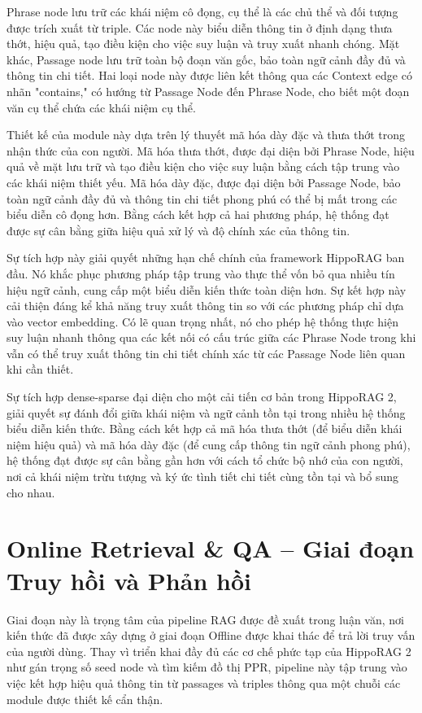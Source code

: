 \documentclass[../main.tex]{subfiles}
\begin{document}
Phrase node lưu trữ các khái niệm cô đọng, cụ thể là các chủ thể và đối tượng được trích xuất từ triple. Các node này biểu diễn thông tin ở định dạng thưa thớt, hiệu quả, tạo điều kiện cho việc suy luận và truy xuất nhanh chóng. Mặt khác, Passage node lưu trữ toàn bộ đoạn văn gốc, bảo toàn ngữ cảnh đầy đủ và thông tin chi tiết. Hai loại node này được liên kết thông qua các Context edge có nhãn "contains," có hướng từ Passage Node đến Phrase Node, cho biết một đoạn văn cụ thể chứa các khái niệm cụ thể.

Thiết kế của module này dựa trên lý thuyết mã hóa dày đặc và thưa thớt trong nhận thức của con người. Mã hóa thưa thớt, được đại diện bởi Phrase Node, hiệu quả về mặt lưu trữ và tạo điều kiện cho việc suy luận bằng cách tập trung vào các khái niệm thiết yếu. Mã hóa dày đặc, được đại diện bởi Passage Node, bảo toàn ngữ cảnh đầy đủ và thông tin chi tiết phong phú có thể bị mất trong các biểu diễn cô đọng hơn. Bằng cách kết hợp cả hai phương pháp, hệ thống đạt được sự cân bằng giữa hiệu quả xử lý và độ chính xác của thông tin.

Sự tích hợp này giải quyết những hạn chế chính của framework HippoRAG ban đầu. Nó khắc phục phương pháp tập trung vào thực thể vốn bỏ qua nhiều tín hiệu ngữ cảnh, cung cấp một biểu diễn kiến thức toàn diện hơn. Sự kết hợp này cải thiện đáng kể khả năng truy xuất thông tin so với các phương pháp chỉ dựa vào vector embedding. Có lẽ quan trọng nhất, nó cho phép hệ thống thực hiện suy luận nhanh thông qua các kết nối có cấu trúc giữa các Phrase Node trong khi vẫn có thể truy xuất thông tin chi tiết chính xác từ các Passage Node liên quan khi cần thiết.

Sự tích hợp dense-sparse đại diện cho một cải tiến cơ bản trong HippoRAG 2, giải quyết sự đánh đổi giữa khái niệm và ngữ cảnh tồn tại trong nhiều hệ thống biểu diễn kiến thức. Bằng cách kết hợp cả mã hóa thưa thớt (để biểu diễn khái niệm hiệu quả) và mã hóa dày đặc (để cung cấp thông tin ngữ cảnh phong phú), hệ thống đạt được sự cân bằng gần hơn với cách tổ chức bộ nhớ của con người, nơi cả khái niệm trừu tượng và ký ức tình tiết chi tiết cùng tồn tại và bổ sung cho nhau.

\section{Online Retrieval \& QA – Giai đoạn Truy hồi và Phản hồi}

Giai đoạn này là trọng tâm của pipeline RAG được đề xuất trong luận văn, nơi kiến thức đã được xây dựng ở giai đoạn Offline được khai thác để trả lời truy vấn của người dùng. Thay vì triển khai đầy đủ các cơ chế phức tạp của HippoRAG 2 như gán trọng số seed node và tìm kiếm đồ thị PPR, pipeline này tập trung vào việc kết hợp hiệu quả thông tin từ passages và triples thông qua một chuỗi các module được thiết kế cẩn thận.
\end{document}
